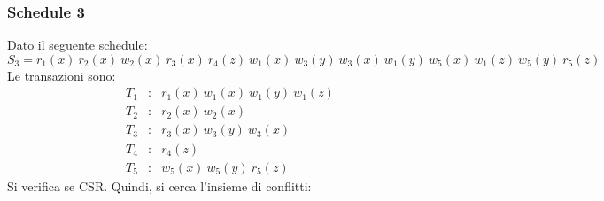 \documentclass[a4paper]{article}
\begin{document}
	\subsubsection{Schedule 3}
	
	Dato il seguente schedule:
	\begin{equation*}
		S_{3} = r_{1}\left(x\right) \: r_{2}\left(x\right) \: w_{2}\left(x\right) \: r_{3}\left(x\right) \: r_{4}\left(z\right) \: w_{1}\left(x\right) \: w_{3}\left(y\right) \: w_{3}\left(x\right) \: w_{1}\left(y\right) \: w_{5}\left(x\right) \: w_{1}\left(z\right) \: w_{5}\left(y\right) \: r_{5}\left(z\right)
	\end{equation*}
	Le transazioni sono:
	\begin{equation*}
		\begin{array}{lll}
			T_{1} &:& r_{1}\left(x\right) \: w_{1}\left(x\right) \: w_{1}\left(y\right) \: w_{1}\left(z\right) \\
			T_{2} &:& r_{2}\left(x\right) \: w_{2}\left(x\right) \\
			T_{3} &:& r_{3}\left(x\right) \: w_{3}\left(y\right) \: w_{3}\left(x\right) \\
			T_{4} &:& r_{4}\left(z\right) \\
			T_{5} &:& w_{5}\left(x\right) \: w_{5}\left(y\right) \: r_{5}\left(z\right)
		\end{array}
	\end{equation*}
	Si verifica se CSR. Quindi, si cerca l'insieme di conflitti:
\end{document}
